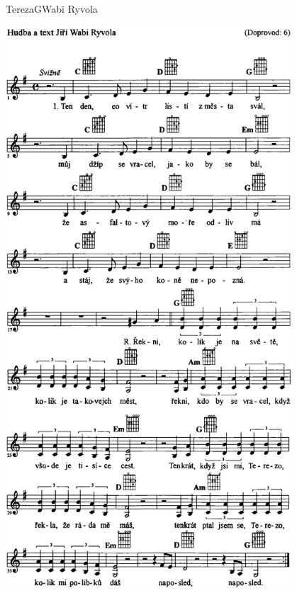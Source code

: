 \setcounter{page}{85}
\begin{song}{Tereza}{G}{Wabi Ryvola}
\begin{center}
\includegraphics[width=0.8\textwidth]{noty/a_tereza} 
\end{center}
\end{song} \pagebreak
